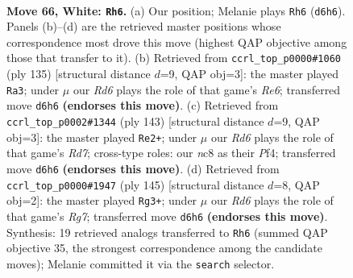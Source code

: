 \documentclass[11pt]{article}
\begin{document}
\clearpage

\begin{figure}[p]\centering
\begin{subfigure}{0.46\textwidth}\centering
\resizebox{\linewidth}{!}{%
\newchessgame
\chessboard[
  setfen={2n1k3/8/3R4/6rp/p7/P7/7K/8 w - - 9 66},
  showmover=false,
  pgfstyle=straightmove, color=movearrow, markmove={d6-h6}
]}
\caption{}
\end{subfigure}\hfill
\begin{subfigure}{0.46\textwidth}\centering
\resizebox{\linewidth}{!}{%
\newchessgame
\chessboard[
  setfen={8/7p/8/5k2/PR6/4r2P/6K1/8 b - - 2 68},
  showmover=false,
  pgfstyle=straightmove, color=movearrow, markmove={e3-a3}
]}
\caption{}
\end{subfigure}
\\[4pt]
\begin{subfigure}{0.46\textwidth}\centering
\resizebox{\linewidth}{!}{%
\newchessgame
\chessboard[
  setfen={1R6/1P4k1/8/4K2p/5p1P/8/3r4/8 b - - 5 72},
  showmover=false,
  pgfstyle=straightmove, color=movearrow, markmove={d2-e2}
]}
\caption{}
\end{subfigure}\hfill
\begin{subfigure}{0.46\textwidth}\centering
\resizebox{\linewidth}{!}{%
\newchessgame
\chessboard[
  setfen={8/8/6Pp/PR6/7k/2K5/6r1/8 b - - 2 73},
  showmover=false,
  pgfstyle=straightmove, color=movearrow, markmove={g2-g3}
]}
\caption{}
\end{subfigure}
\caption{\textbf{Move 66, White: \texttt{Rh6}.} (a) Our position; Melanie plays \texttt{Rh6} (\texttt{d6h6}). Panels (b)--(d) are the retrieved master positions whose correspondence most drove this move (highest QAP objective among those that transfer to it). (b) Retrieved from \texttt{ccrl\_top\_p0000\#1060} (ply 135) [structural distance $d$=9, QAP obj=3]: the master played \texttt{Ra3}; under $\mu$ our \emph{Rd6} plays the role of that game's \emph{Re6}; transferred move \texttt{d6h6} \textbf{(endorses this move)}. (c) Retrieved from \texttt{ccrl\_top\_p0002\#1344} (ply 143) [structural distance $d$=9, QAP obj=3]: the master played \texttt{Re2+}; under $\mu$ our \emph{Rd6} plays the role of that game's \emph{Rd7}; cross-type roles: our \emph{n}c8 as their \emph{P}f4; transferred move \texttt{d6h6} \textbf{(endorses this move)}. (d) Retrieved from \texttt{ccrl\_top\_p0000\#1947} (ply 145) [structural distance $d$=8, QAP obj=2]: the master played \texttt{Rg3+}; under $\mu$ our \emph{Rd6} plays the role of that game's \emph{Rg7}; transferred move \texttt{d6h6} \textbf{(endorses this move)}. Synthesis: 19 retrieved analogs transferred to \texttt{Rh6} (summed QAP objective 35, the strongest correspondence among the candidate moves); Melanie committed it via the \texttt{search} selector.}
\label{fig:thought-m130}
\end{figure}
\end{document}
